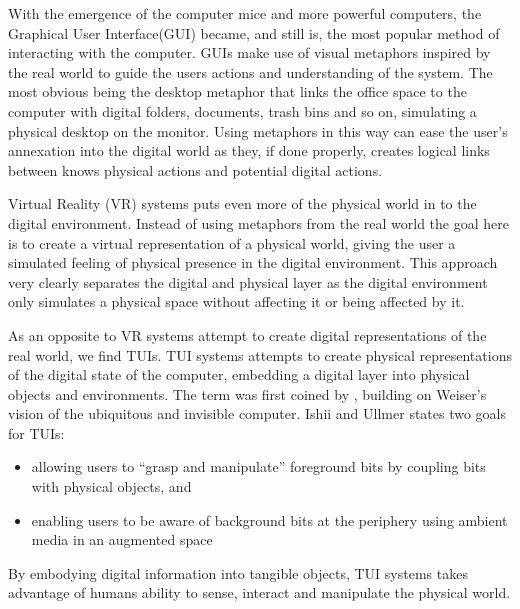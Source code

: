 With the emergence of the computer mice and more powerful computers, the Graphical User Interface(GUI) became, and still is, the most popular method of interacting with the computer.
GUIs make use of visual metaphors inspired by the real world to guide the users actions and understanding of the system.
The most obvious being the desktop metaphor that links the office space to the computer with digital folders, documents, trash bins and so on, simulating a physical desktop on the monitor.
Using metaphors in this way can ease the user's annexation into the digital world as they, if done properly, creates logical links between knows physical actions and potential digital actions.

Virtual Reality (VR) systems puts even more of the physical world in to the digital environment.
Instead of using metaphors from the real world the goal here is to create a virtual representation of a physical world, giving the user a simulated feeling of physical presence in the digital environment.
This approach very clearly separates the digital and physical layer as the digital environment only simulates a physical space without affecting it or being affected by it.

As an opposite to VR systems attempt to create digital representations of the real world, we find TUIs.
TUI systems attempts to create physical representations of the digital state of the computer, embedding a digital layer into physical objects and environments.
The term was first coined by \citet{ishii1997tangible}, building on Weiser's vision of the ubiquitous and invisible computer.
Ishii and Ullmer states two goals for TUIs:
\begin{itemize}
		\item{allowing users to ``grasp and manipulate'' foreground bits by coupling bits with physical objects, and}
		\item{enabling users to be aware of background bits at the periphery using ambient media in an augmented space}
\end{itemize}
By embodying digital information into tangible objects, TUI systems takes advantage of humans ability to sense, interact and manipulate the physical world. 


